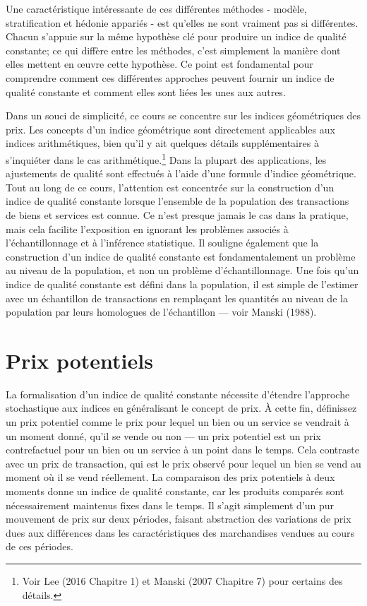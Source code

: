 \documentclass[]{article}
\begin{document}
Une caractéristique intéressante de ces différentes méthodes - modèle, stratification et hédonie appariés - est qu'elles ne sont vraiment pas si différentes. Chacun s'appuie sur la même hypothèse clé pour produire un indice de qualité constante; ce qui diffère entre les méthodes, c'est simplement la manière dont elles mettent en œuvre cette hypothèse. Ce point est fondamental pour comprendre comment ces différentes approches peuvent fournir un indice de qualité constante et comment elles sont liées les unes aux autres.

Dans un souci de simplicité, ce cours se concentre sur les indices géométriques des prix. Les concepts d'un indice géométrique sont directement applicables aux indices arithmétiques, bien qu'il y ait quelques détails supplémentaires à s'inquiéter dans le cas arithmétique.\footnote{Voir Lee (2016 Chapitre 1) et Manski (2007 Chapitre 7) pour certains des détails.} Dans la plupart des applications, les ajustements de qualité sont effectués à l'aide d'une formule d'indice géométrique. Tout au long de ce cours, l'attention est concentrée sur la construction d'un indice de qualité constante lorsque l'ensemble de la population des transactions de biens et services est connue. Ce n'est presque jamais le cas dans la pratique, mais cela facilite l'exposition en ignorant les problèmes associés à l'échantillonnage et à l'inférence statistique. Il souligne également que la construction d'un indice de qualité constante est fondamentalement un problème au niveau de la population, et non un problème d'échantillonnage. Une fois qu'un indice de qualité constante est défini dans la population, il est simple de l'estimer avec un échantillon de transactions en remplaçant les quantités au niveau de la population par leurs homologues de l'échantillon --- voir Manski (1988).

\hypertarget{prix-potentiels}{%
\section{Prix potentiels}\label{prix-potentiels}}

La formalisation d'un indice de qualité constante nécessite d'étendre l'approche stochastique aux indices en généralisant le concept de prix. À cette fin, définissez un prix potentiel comme le prix pour lequel un bien ou un service se vendrait à un moment donné, qu'il se vende ou non --- un prix potentiel est un prix contrefactuel pour un bien ou un service à un point dans le temps. Cela contraste avec un prix de transaction, qui est le prix observé pour lequel un bien se vend au moment où il se vend réellement. La comparaison des prix potentiels à deux moments donne un indice de qualité constante, car les produits comparés sont nécessairement maintenus fixes dans le temps. Il s'agit simplement d'un pur mouvement de prix sur deux périodes, faisant abstraction des variations de prix dues aux différences dans les caractéristiques des marchandises vendues au cours de ces périodes.
\end{document}

